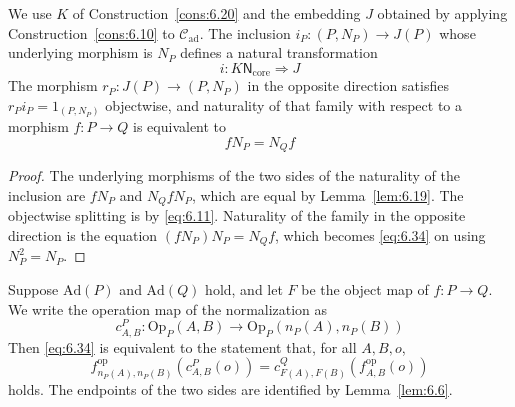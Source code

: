 \begin{proposition}\label{prop:6.23}

We use $K$ of Construction~\ref{cons:6.20} and the embedding $J$ obtained by applying
Construction~\ref{cons:6.10} to $\mathcal{C}_{\mathrm{ad}}$.
The inclusion $i_P:(P,N_P)\to J(P)$ whose underlying morphism is $N_P$ defines a natural
transformation
\begin{equation*}
i:K\mathsf{N}_{\mathrm{core}}\Longrightarrow J
\tag{6.33}\label{eq:6.33}
\end{equation*}
The morphism $r_P:J(P)\to(P,N_P)$ in the opposite direction satisfies
$r_Pi_P=1_{(P,N_P)}$ objectwise, and naturality of that family with respect to a morphism
$f:P\to Q$ is equivalent to
\begin{equation*}
fN_P=N_Qf
\tag{6.34}\label{eq:6.34}
\end{equation*}

\end{proposition}

\begin{proof}

The underlying morphisms of the two sides of the naturality of the inclusion are $fN_P$ and
$N_QfN_P$, which are equal by Lemma~\ref{lem:6.19}.
The objectwise splitting is by \eqref{eq:6.11}.
Naturality of the family in the opposite direction is the equation $(fN_P)N_P=N_Qf$, which
becomes \eqref{eq:6.34} on using $N_P^2=N_P$.

\end{proof}

\begin{proposition}\label{prop:6.24}

Suppose $\mathrm{Ad}(P)$ and $\mathrm{Ad}(Q)$ hold, and let $F$ be the object map of
$f:P\to Q$.
We write the operation map of the normalization as
\begin{equation*}
c^P_{A,B}:\mathrm{Op}_P(A,B)
\longrightarrow\mathrm{Op}_P(n_P(A),n_P(B))
\tag{6.35}\label{eq:6.35}
\end{equation*}
Then \eqref{eq:6.34} is equivalent to the statement that, for all $A,B,o$,
\begin{equation*}
f^{\mathrm{op}}_{n_P(A),n_P(B)}(c^P_{A,B}(o))
=c^Q_{F(A),F(B)}(f^{\mathrm{op}}_{A,B}(o))
\tag{6.36}\label{eq:6.36}
\end{equation*}
holds. The endpoints of the two sides are identified by Lemma~\ref{lem:6.6}.

\end{proposition}

